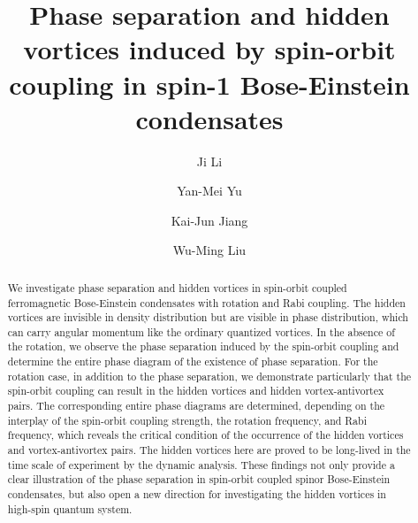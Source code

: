 \documentclass[aps,pra,showpacs,twocolumn,superscriptaddress]{revtex4-1}
\begin{document}
\title{Phase separation and hidden vortices induced by spin-orbit coupling in spin-1 Bose-Einstein condensates}
\author{Ji Li}
\author{Yan-Mei Yu}
\author{Kai-Jun Jiang}
\author{Wu-Ming Liu}

\begin{abstract}
  We investigate phase separation and hidden vortices in spin-orbit coupled ferromagnetic
  Bose-Einstein condensates with rotation and Rabi coupling. The hidden vortices are invisible in density distribution but
  are visible in phase distribution, which can carry angular momentum like the
  ordinary quantized vortices. In the absence of the rotation,
  we observe the phase separation induced by the spin-orbit coupling and determine the entire
  phase diagram of the existence of phase separation. For the rotation case, in addition to the phase separation,
  we demonstrate particularly that the spin-orbit coupling can result in the hidden vortices and hidden vortex-antivortex pairs.
  The corresponding entire phase diagrams are determined, depending on the interplay of
  the spin-orbit coupling strength, the rotation frequency, and Rabi frequency, which reveals the critical condition of
  the occurrence of the hidden vortices and vortex-antivortex pairs. The hidden vortices here
  are proved to be long-lived in the time scale of experiment by the dynamic analysis. These findings not only provide
  a clear illustration of the phase separation in spin-orbit coupled spinor Bose-Einstein condensates,
  but also open a new direction for investigating the hidden vortices in high-spin quantum system.


\end{abstract}
 \maketitle
\end{document}
